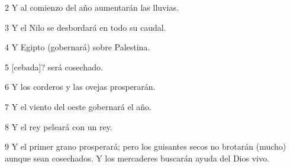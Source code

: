 \par 2 Y al comienzo del año aumentarán las lluvias.

\par 3 Y el Nilo se desbordará en todo su caudal.

\par 4 Y Egipto (gobernará) sobre Palestina.

\par 5 [cebada]? será cosechado.

\par 6 Y los corderos y las ovejas prosperarán.

\par 7 Y el viento del oeste gobernará el año.

\par 8 Y el rey peleará con un rey.

\par 9 Y el primer grano prosperará; pero los guisantes secos no brotarán (mucho) aunque sean cosechados. Y los mercaderes buscarán ayuda del Dios vivo.



